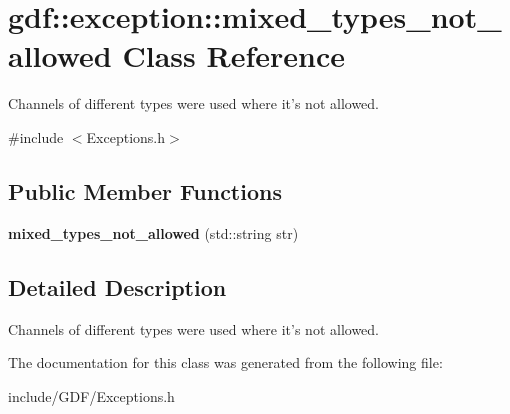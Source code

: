\hypertarget{classgdf_1_1exception_1_1mixed__types__not__allowed}{
\section{gdf::exception::mixed\_\-types\_\-not\_\-allowed Class Reference}
\label{classgdf_1_1exception_1_1mixed__types__not__allowed}
}


Channels of different types were used where it's not allowed.  




{\ttfamily \#include $<$Exceptions.h$>$}

\subsection*{Public Member Functions}
\begin{DoxyCompactItemize}
\item 
\hypertarget{classgdf_1_1exception_1_1mixed__types__not__allowed_afedb67ea57a869c684df590bce99b18c}{
{\bfseries mixed\_\-types\_\-not\_\-allowed} (std::string str)}
\label{classgdf_1_1exception_1_1mixed__types__not__allowed_afedb67ea57a869c684df590bce99b18c}

\end{DoxyCompactItemize}


\subsection{Detailed Description}
Channels of different types were used where it's not allowed. 

The documentation for this class was generated from the following file:\begin{DoxyCompactItemize}
\item 
include/GDF/Exceptions.h\end{DoxyCompactItemize}
